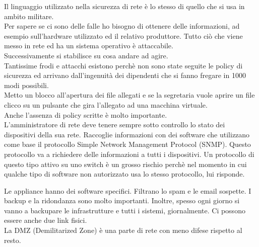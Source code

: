 \documentclass{article}
\begin{document}
    Il linguaggio utilizzato nella sicurezza di rete è lo stesso di quello che si usa in ambito militare.\\
    Per sapere se ci sono delle falle ho bisogno di ottenere delle informazioni, ad esempio sull'hardware utilizzato ed il relativo produttore. Tutto ciò che viene messo in rete ed ha un sistema operativo è attaccabile.\\
    Successivamente si stabilisce su cosa andare ad agire.\\
    Tantissime frodi e attacchi esistono perchè non sono state seguite le policy di sicurezza ed arrivano dall'ingenuità dei dipendenti che si fanno fregare in 1000 modi possibili.\\
    Metto un blocco all'apertura dei file allegati e se la segretaria vuole aprire un file clicco su un pulsante che gira l'allegato ad una macchina virtuale.\\
    Anche l'assenza di policy scritte è molto importante.\\
    L'amministratore di rete deve tenere sempre sotto controllo lo stato dei dispositivi della sua rete. Raccoglie informazioni con dei software che utilizzano come base il protocollo Simple Network Management Protocol (SNMP). Questo protocollo va a richiedere delle informazioni a tutti i dispositivi. Un protocollo di questo tipo attivo su uno switch è un grosso rischio perchè nel momento in cui qualche tipo di software non autorizzato usa lo stesso protocollo, lui risponde.

    Le appliance hanno dei software specifici. Filtrano lo spam e le email sospette.
    I backup e la ridondanza sono molto importanti. Inoltre, spesso ogni giorno si vanno a backupare le infrastrutture e tutti i sistemi, giornalmente. Ci possono essere anche due link fisici.\\

    La DMZ (Demilitarized Zone) è una parte di rete con meno difese rispetto al resto.
\end{document}
